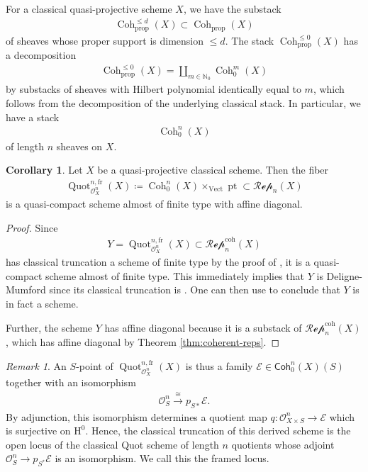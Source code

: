 \documentclass{article}
\numberwithin{equation}{section}
\theoremstyle{quest}
\theoremstyle{definition}
\newtheorem{cor}[thm]{Corollary}
\theoremstyle{remark}
\newtheorem{rmk}[thm]{Remark}
\DeclareMathOperator{\pt}{pt}
\DeclareMathOperator{\Coh}{Coh}
\DeclareMathOperator{\Quot}{Quot}
\DeclareMathOperator{\Vect}{Vect}
\begin{document}
For a classical quasi-projective scheme $X$, we have the substack
\begin{align*}
\Coh_{\text{prop}}^{\le d}(X)\subset \Coh_{\text{prop}}(X)
\end{align*} 
of sheaves whose proper support is dimension $\le d$. The stack $\Coh_{\text{prop}}^{\le 0}(X)$ has a decomposition
\begin{align*}
	\Coh_{\text{prop}}^{\le 0}(X)=\coprod_{m\in \mathbb{N}_0}\Coh_0^m(X)
\end{align*} 
by substacks of sheaves with Hilbert polynomial identically equal to $m$, which follows from the decomposition of the underlying classical stack. In particular, we have a stack
\begin{align*}
	\Coh^n_0(X)
\end{align*} 
of length $n$ sheaves on $X$.
\begin{cor}\label{cor:quot-is-a-scheme}
Let $X$ be a quasi-projective classical scheme. Then the fiber
\begin{align*}
	\Quot^{n,\text{fr}}_{\mathscr{O}^n_{X}}(X)\coloneqq \Coh^n_0(X)\times _{\Vect}\pt\subset \mathscr{Rep}_n(X)
\end{align*} 
is a quasi-compact scheme almost of finite type with affine diagonal.
\end{cor} 
\begin{proof}
	Since
	\begin{align*}
		Y=\Quot^{n,\text{fr}}_{\mathscr{O}_X^n}(X)\subset \mathscr{Rep}_n^{\text{coh}}(X)
	\end{align*} 
	has classical truncation a scheme of finite type by the proof of \cite[Proposition 4.4.1]{KV}, it is a quasi-compact scheme almost of finite type. This immediately implies that $Y$ is Deligne-Mumford since its classical truncation is \cite[Definition 8.5.7(iii)]{khan-underlying-classical-is-dm-implies-dm}. One can then use \cite[Corollary 1.6.7.4]{sag} to conclude that $Y$ is in fact a scheme. 

	Further, the scheme $Y$ has affine diagonal because it is a substack of $\mathscr{Rep}_n^{\text{coh}}(X)$, which has affine diagonal by Theorem \ref{thm:coherent-reps}.
\end{proof} 
\begin{rmk}
	An $S$-point of $\Quot^{n,\text{fr}}_{\mathscr{O}_X^n}(X)$ is thus a family $\mathscr{E}\in \mathsf{Coh}^n_0(X)(S)$ together with an isomorphism
	\begin{align*}
		\mathscr{O}^n_S\xrightarrow{\cong}p_{S*}\mathscr{E}.
	\end{align*} 
	By adjunction, this isomorphism determines a quotient map $q: \mathscr{O}^n_{X\times S}\to \mathscr{E}$ which is surjective on $\mathrm H^0$. Hence, the classical truncation of this derived scheme is the open locus of the classical Quot scheme of length $n$ quotients whose adjoint $\mathscr{O}^n_S\to p_{S^*}\mathscr{E}$ is an isomorphism. We call this the framed locus.
\end{rmk} 
\end{document}
